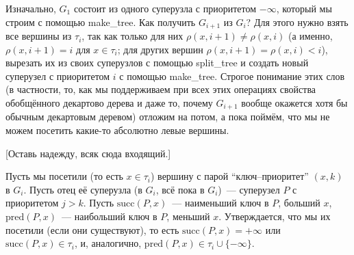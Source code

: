 
Изначально, $G_1$ состоит из одного суперузла с приоритетом $-\infty$, который мы строим с помощью \textrm{make\_tree}. 
Как получить $G_{i+1}$ из $G_i$? Для этого нужно взять все
вершины из $\tau_i$, так как только для них $\rho(x, i+1) \neq \rho(x,i)$ (а именно, $\rho(x, i + 1) = i$ для $x \in \tau_i$; для других вершин $\rho(x, i + 1) = \rho(x, i) < i$), 
вырезать их из своих суперузлов с помощью \textrm{split\_tree} и создать новый суперузел с приоритетом $i$ с помощью \textrm{make\_tree}. Строгое понимание этих слов (в частности, то, как мы поддерживаем при всех этих операциях свойства обобщённого декартово дерева и даже то, почему $G_{i+1}$ вообще окажется хотя бы обычным декартовым деревом) отложим на потом, а пока поймём, что мы не можем посетить какие-то абсолютно левые вершины.

[Оставь надежду, всяк сюда входящий.]

Пусть мы посетили (то есть $x \in \tau_i$) вершину с парой ``ключ--приоритет'' $(x, k)$ в $G_i$. Пусть отец её суперузла (в $G_i$, всё пока в $G_i$)~--- суперузел $P$ с приоритетом $j > k$. 
Пусть $\mathrm{succ}(P, x)$~--- наименьший ключ в $P$, больший $x$, $\mathrm{pred}(P, x)$~--- наибольший ключ в $P$, меньший $x$.
Утверждается, что мы их посетили (если они существуют), то есть $\mathrm{succ}(P, x) = +\infty$ или $\mathrm{succ}(P, x) \in \tau_i$, и, аналогично, $\mathrm{pred}(P, x) \in \tau_i \cup \{-\infty\}$.

